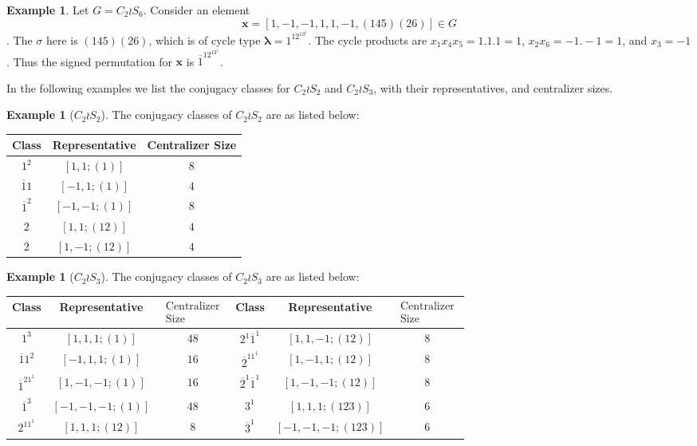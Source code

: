 \documentclass[12pt,twoside,reqno]{amsart}
\theoremstyle{definition}
\newtheorem{example}[theorem]{Example}
\numberwithin{equation}{section}
\newcommand{\bmf}[1]{\mathbf{#1}}
\newcommand{\Lbd}{\bm {\lambda}}
\begin{document}
\begin{example}
Let  $G=C_2 \wr S_6$. Consider an element $$\bmf{x} = [1,-1,-1,1,1,-1, (145)(26)]\in G$$. The $\sigma$ here is $(145)(26)$, which is of cycle type $\Lbd = 1^12^13^1$. The cycle products are $x_1x_4x_5= 1.1.1 =1$, $x_2x_6 = -1.-1 = 1$, and $x_3 = -1$. Thus the signed permutation for $\bmf{x}$ is $\overline{1}^12^13^1$. 
\end{example}


In the following examples we list the conjugacy classes for $C_2 \wr S_2$ and $C_2 
\wr S_3$, with their representatives, and centralizer sizes.
\begin{example}[$C_2 \wr S_2$]
The conjugacy classes of $C_2 \wr S_2$ are as listed below:
\begin{center}
\begin{tabular}{|c|c|c|}\hline
Class & Representative & Centralizer Size \\ \hline
$1^2$ & $[1,1; (1)]$ & $8$\\ \hline
$\overline{1}1$ & $[-1,1; (1)]$ & $4$\\ \hline
$\overline{1}^2$ & $[-1,-1; (1)]$ & $8$ \\ \hline
$2$ & $[1,1; (12)]$ & $4$ \\ \hline
$\overline{2}$ & $[1,-1;(12)]$ & $4$ \\\hline
\end{tabular}
\end{center}
\end{example}
\begin{example}[$C_2 \wr S_3$]
The conjugacy classes of $C_2 \wr S_3$ are as listed below:
\begin{center}
\begin{tabular}{|c|c|c||c|c|c|}\hline
Class & Representative & $\begin{smallmatrix}\text{Centralizer}\\ \text{Size}
\end{smallmatrix}$ & Class & Representative & $\begin{smallmatrix}\text{Centralizer}\\ \text{Size}
\end{smallmatrix}$ \\ \hline
$1^3$ & $[1,1,1; (1)]$ & $48$ & $2^1\overline{1}^1$ & $[1,1,-1;(12)]$& $8$ \\ \hline
$\overline{1}1^2$ & $[-1,1,1; (1)]$ & $16$ & $\overline{2}^11^1$ &$[1,-1,1;(12)]$ & $8$\\ \hline
$\overline{1}^21^1$ & $[1,-1,-1; (1)]$ & $16$ & $\overline{2}^1\overline{1}^1$ & $[1,-1,-1;(12)]$ & $8$ \\ \hline
$\overline{1}^3$ & $[-1,-1,-1; (1)]$ & $48$ & $3^1$ & $[1,1,1;(123)]$ & $6$\\ \hline
$2^11^1$ & $[1,1,1;(12)]$ & $8$  & $\overline{3}^1$ & $[-1,-1,-1; (123)]$ & $6$\\\hline
\end{tabular}
\end{center}
\end{example}
\end{document}
